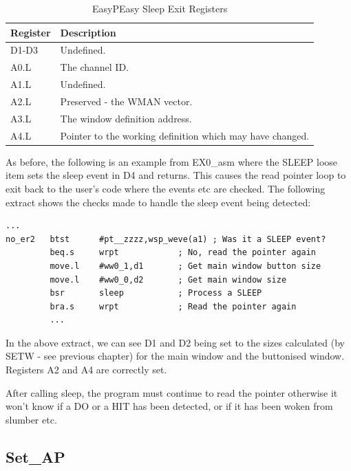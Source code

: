 \begin{table}[htbp]
\centering
\begin{tabular}{l p{}}
\toprule
\textbf{Register} & \textbf{Description}  \\
\midrule
%
D1-D3 & Undefined. \\
A0.L  & The channel ID.\\
A1.L  & Undefined.\\
A2.L  & Preserved - the WMAN vector.\\
A3.L  & The window definition address.\\
A4.L  & Pointer to the working definition which may have changed.\\
%
\bottomrule
\end{tabular}
\caption{EasyPEasy Sleep Exit Registers}
\label{tab:EasyPEasySleepExitRegisters}
\end{table}


As before, the following is an example from EX0\_asm             where the SLEEP loose item sets the sleep event in D4 and returns. This causes
            the read pointer loop to exit back to the user's code where the events etc are
            checked. The following extract shows the checks made to handle the sleep event
            being detected:

\begin{lstlisting}[firstnumber=1,caption={EasyPEasy - Sleep Example},label={lst:EasyPeasySleepExample}]
         ...
no_er2   btst      #pt__zzzz,wsp_weve(a1) ; Was it a SLEEP event?
         beq.s     wrpt            ; No, read the pointer again
         move.l    #ww0_1,d1       ; Get main window button size
         move.l    #ww0_0,d2       ; Get main window size
         bsr       sleep           ; Process a SLEEP
         bra.s     wrpt            ; Read the pointer again
         ...
\end{lstlisting}

In the above extract, we can see D1 and D2 being set to the sizes
            calculated (by SETW -{} see previous chapter) for the main window and the
            buttonised window. Registers A2 and A4 are correctly set.

After calling sleep, the program must continue to read the pointer
            otherwise it won't know if a DO or a HIT has been detected, or if it has been
            woken from slumber etc.

\subsection{Set\_AP}
\label{ch26-sub-set_ap}%

